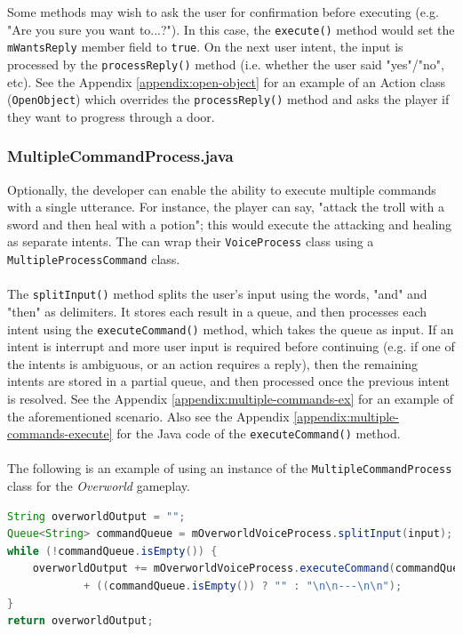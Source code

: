 \documentclass[12pt]{article}
\begin{document}
Some methods may wish to ask the user for confirmation before executing (e.g. "Are you sure you want to...?"). In this case, the \texttt{execute()} method would set the \texttt{mWantsReply} member field to \texttt{true}. On the next user intent, the input is processed by the \texttt{processReply()} method (i.e. whether the user said "yes"/"no", etc). See the Appendix \ref{appendix:open-object} for an example of an Action class (\texttt{OpenObject}) which overrides the \texttt{processReply()} method and asks the player if they want to progress through a door.

\subsubsection{MultipleCommandProcess.java}

Optionally, the developer can enable the ability to execute multiple commands with a single utterance. For instance, the player can say, "attack the troll with a sword and then heal with a potion"; this would execute the attacking and healing as separate intents. The can wrap their \texttt{VoiceProcess} class using a \texttt{MultipleProcessCommand} class.
\\
\\
The \texttt{splitInput()} method splits the user's input using the words, "and" and "then" as delimiters. It stores each result in a queue, and then processes each intent using the \texttt{executeCommand()} method, which takes the queue as input. If an intent is interrupt and more user input is required before continuing (e.g. if one of the intents is ambiguous, or an action requires a reply), then the remaining intents are stored in a partial queue, and then processed once the previous intent is resolved. See the Appendix \ref{appendix:multiple-commands-ex} for an example of the aforementioned scenario. Also see the Appendix \ref{appendix:multiple-commands-execute} for the Java code of the \texttt{executeCommand()} method.
\\
\\
The following is an example of using an instance of the \texttt{MultipleCommandProcess} class for the \textit{Overworld} gameplay.

\begin{lstlisting}[language=Java]
String overworldOutput = "";
Queue<String> commandQueue = mOverworldVoiceProcess.splitInput(input);
while (!commandQueue.isEmpty()) {
    overworldOutput += mOverworldVoiceProcess.executeCommand(commandQueue)
            + ((commandQueue.isEmpty()) ? "" : "\n\n---\n\n");
}
return overworldOutput;
\end{lstlisting}
\end{document}
